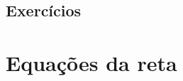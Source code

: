 \subsection*{Exercícios}

\emconstrucao

\section{Equações da reta}\label{cap_ert_sec_eqsreta}

\emconstrucao
